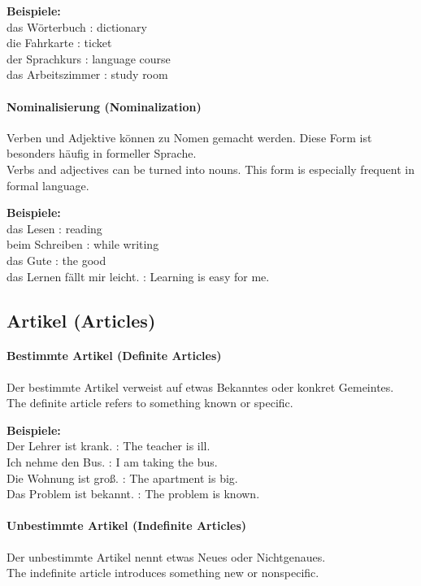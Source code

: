 \documentclass[a4paper]{article}
\begin{document}
            \textbf{Beispiele:}\\
            das Wörterbuch : dictionary\\
            die Fahrkarte : ticket\\
            der Sprachkurs : language course\\
            das Arbeitszimmer : study room
        
        \paragraph{Nominalisierung {\small (Nominalization)}}
            Verben und Adjektive können zu Nomen gemacht werden. Diese Form ist besonders häufig in formeller Sprache.\\
            Verbs and adjectives can be turned into nouns. This form is especially frequent in formal language.
            
            \textbf{Beispiele:}\\
            das Lesen : reading\\
            beim Schreiben : while writing\\
            das Gute : the good\\
            das Lernen fällt mir leicht. : Learning is easy for me.
    
    \subsection{Artikel {\small (Articles)}}
    
    \paragraph{Bestimmte Artikel {\small (Definite Articles)}}
        Der bestimmte Artikel verweist auf etwas Bekanntes oder konkret Gemeintes.\\
        The definite article refers to something known or specific.
        
        \textbf{Beispiele:}\\
        Der Lehrer ist krank. : The teacher is ill.\\
        Ich nehme den Bus. : I am taking the bus.\\
        Die Wohnung ist groß. : The apartment is big.\\
        Das Problem ist bekannt. : The problem is known.
    
    \paragraph{Unbestimmte Artikel {\small (Indefinite Articles)}}
        Der unbestimmte Artikel nennt etwas Neues oder Nichtgenaues.\\
        The indefinite article introduces something new or nonspecific.
        
\end{document}

